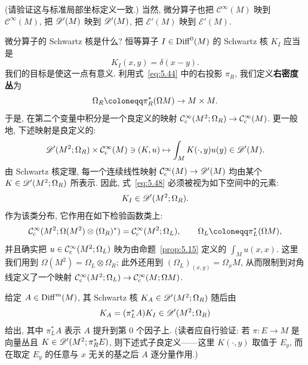 (请验证这与标准局部坐标定义一致.) 当然, 微分算子也把 $\mathcal{C}^\infty(M)$ 映到 $\mathcal{C}^\infty(M)$, 把 $\mathscr{D}'(M)$ 映到 $\mathscr{D}'(M)$, 把 $\mathscr{E}'(M)$ 映到 $\mathscr{E}'(M)$.

微分算子的 Schwartz 核是什么? 恒等算子 $I \in \operatorname{Diff}^0(M)$ 的 Schwartz 核 $K_I$ 应当是
\begin{equation}\label{eq:5.48}
    K_I(x, y) = \delta(x - y).
\end{equation}
我们的目标是使这一点有意义. 利用式~\eqref{eq:5.44} 中的右投影 $\pi_R$, 我们定义\textbf{右密度丛}为
\begin{equation}\label{eq:5.49}
    \Omega_R \defeq \pi_R^*(\Omega M) \to M \times M.
\end{equation}
于是, 在第二个变量中积分是一个良定义的映射 $\mathcal{C}_{\mathrm{c}}^\infty(M^2; \Omega_R) \to \mathcal{C}_{\mathrm{c}}^\infty(M)$. 更一般地, 下述映射是良定义的:
\begin{equation}\label{eq:5.50}
    \mathscr{D}'(M^2; \Omega_R) \times \mathcal{C}_{\mathrm{c}}^\infty(M) \ni (K, u) \mapsto \int_M K(\cdot, y) u(y) \in \mathscr{D}'(M).
\end{equation}
由 Schwartz 核定理, 每一个连续线性映射 $\mathcal{C}_{\mathrm{c}}^\infty(M) \to \mathscr{D}'(M)$ 均由某个 $K \in \mathscr{D}'(M^2; \Omega_R)$ 所表示. 因此, 式~\eqref{eq:5.48} 必须被视为如下空间中的元素:
\begin{equation}\label{eq:5.51}
    K_I \in \mathscr{D}'(M^2; \Omega_R).
\end{equation}
作为该类分布, 它作用在如下检验函数类上:
\begin{equation}\label{eq:5.52}
    \SmoothComp(M^2; \Omega(M^2) \otimes (\Omega_R)^*) = \SmoothComp(M^2; \Omega_L), \qquad \Omega_L \defeq \pi_L^*(\Omega M),
\end{equation}
并且确实把 $u \in \mathcal{C}_{\mathrm{c}}^\infty(M^2; \Omega_L)$ 映为由命题~\ref{prop:5.15} 定义的 $\int_M u(x, x)$. 这里我们用到 $\Omega(M^2) = \Omega_L \otimes \Omega_R$; 此外还用到 $(\Omega_L)_{(x, y)} = \Omega_x M$, 从而限制到对角线定义了一个映射 $\mathcal{C}_{\mathrm{c}}^\infty(M^2; \Omega_L) \to \mathcal{C}_{\mathrm{c}}^\infty(M; \Omega M)$.

给定 $A \in \operatorname{Diff}^m(M)$, 其 Schwartz 核 $K_A \in \mathscr{D}'(M^2; \Omega_R)$ 随后由
\begin{equation}\label{eq:5.53}
    K_A = (\pi_L^* A) K_I \in \mathscr{D}'(M^2; \Omega_R)
\end{equation}
给出, 其中 $\pi_L^* A$ 表示 $A$ 提升到第 0 个因子上. (读者应自行验证: 若 $\pi \colon E \to M$ 是向量丛且 $K \in \mathscr{D}'(M^2; \pi_R^* E)$, 则下述式子良定义——这里 $K(\cdot, y)$ 取值于 $E_y$, 而在取定 $E_y$ 的任意与 $x$ 无关的基之后 $A$ 逐分量作用.)

